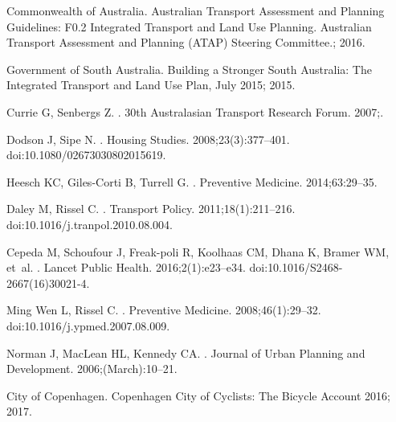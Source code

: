 {Commonwealth of Australia}. {Australian Transport Assessment and Planning
  Guidelines: F0.2 Integrated Transport and Land Use Planning. Australian
  Transport Assessment and Planning (ATAP) Steering Committee.}; 2016.

{Government of South Australia}. {Building a Stronger South Australia: The
  Integrated Transport and Land Use Plan, July 2015}; 2015.

Currie G, Senbergs Z.
.
\newblock 30th Australasian Transport Research Forum. 2007;.

Dodson J, Sipe N.
.
\newblock Housing Studies. 2008;23(3):377--401.
\newblock doi:{10.1080/02673030802015619}.

Heesch KC, Giles-Corti B, Turrell G.
.
\newblock Preventive Medicine. 2014;63:29--35.

Daley M, Rissel C.
.
\newblock Transport Policy. 2011;18(1):211--216.
\newblock doi:{10.1016/j.tranpol.2010.08.004}.

Cepeda M, Schoufour J, Freak-poli R, Koolhaas CM, Dhana K, Bramer WM, et~al.
.
\newblock Lancet Public Health. 2016;2(1):e23--e34.
\newblock doi:{10.1016/S2468-2667(16)30021-4}.

{Ming Wen} L, Rissel C.
.
\newblock Preventive Medicine. 2008;46(1):29--32.
\newblock doi:{10.1016/j.ypmed.2007.08.009}.

Norman J, MacLean HL, Kennedy CA.
.
\newblock Journal of Urban Planning and Development. 2006;(March):10--21.

{City of Copenhagen}. {Copenhagen City of Cyclists: The Bicycle Account 2016};
  2017.

